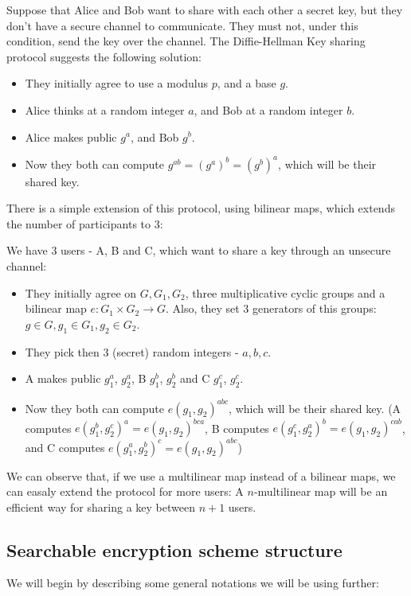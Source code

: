 \documentclass[a4paper, 12pt, oneside]{article}
\begin{document}
Suppose that Alice and Bob want to share with each other a secret key, but they don't have a secure channel to communicate. They must not, under this condition, send the key over the channel. The Diffie-Hellman Key sharing protocol suggests the following solution:
\begin{itemize}

\item They initially agree to use a modulus $p$, and a base $g$.
\item Alice thinks at a random integer $a$, and Bob at a random integer $b$.
\item Alice makes public $g^a$, and Bob $g^b$.
\item Now they both can compute $g^{ab} = (g^a)^b = (g^b)^a$, which will be their shared key.

\end{itemize}

There is a simple extension of this protocol, using bilinear maps, which extends the number of participants to 3:

We have 3 users - A, B and C, which want to share a key through an unsecure channel:

\begin{itemize}

\item They initially agree on $G, G_1, G_2$, three multiplicative cyclic groups and a bilinear map $e : G_1 \times G_2 \rightarrow G$. Also, they set 3 generators of this groups: $g\in G, g_1 \in G_1, g_2 \in G_2$.
\item They pick then 3 (secret) random integers - $a, b, c$.
\item A makes public $g_1^a$, $g_2^a$, B $g_1^b$, $g_2^b$ and C $g_1^c$, $g_2^c$.
\item Now they both can compute $e(g_1, g_2)^{abc}$, which will be their shared key. (A computes $e(g_1^b, g_2^c)^a = e(g_1, g_2)^{bca}$, B computes $e(g_1^c, g_2^a)^b = e(g_1, g_2)^{cab}$, and C computes $e(g_1^a, g_2^b)^c = e(g_1, g_2)^{abc}$)

\end{itemize}

We can observe that, if we use a multilinear map instead of a bilinear maps, we can easaly extend the protocol for more users: A $n$-multilinear map will be an efficient way for sharing a key between $n+1$ users.

\subsection{Searchable encryption scheme structure}
We will begin by describing some general notations we will be using further:
\end{document}

